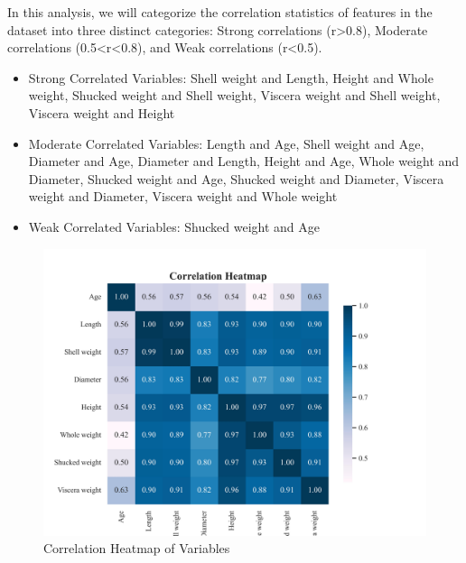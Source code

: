 \documentclass{article}
\begin{document}
\begin{minipage}[t]{0.5\linewidth}
    In this analysis, we will categorize the correlation statistics of features in the dataset into three distinct categories: Strong correlations (r>0.8), Moderate correlations (0.5<r<0.8), and Weak correlations (r<0.5).

\begin{itemize}
\item Strong Correlated Variables: Shell weight and Length, Height and Whole weight, Shucked weight and Shell weight, Viscera weight and Shell weight, Viscera weight and Height
\item Moderate Correlated Variables: Length and Age, Shell weight and Age, Diameter and Age, Diameter and Length, Height and Age, Whole weight and Diameter, Shucked weight and Age, Shucked weight and Diameter, Viscera weight and Diameter, Viscera weight and Whole weight
\item Weak Correlated Variables: Shucked weight and Age
\end{itemize}
\vfill
\end{minipage}
\hfill
\begin{minipage}[t]{0.5\linewidth}
    \begin{figure}[H]
        \centering
        \vspace{-1.5cm}
        \includegraphics[width=\linewidth]{./demo_data/20241104_111650/Abalone/output_graph/eda_corr.jpg}
        \caption{\label{fig:corr}Correlation Heatmap of Variables}
    \end{figure}
\end{minipage}
\end{document}
